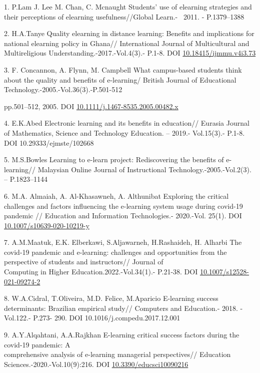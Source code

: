 \begin{references}
1. P.Lam J. Lee M. Chan, C. Mcnaught Students' use of elearning
strategies and their perceptions of elearning usefulness//Global
Learn.-\emph{~} 2011. - P.1379--1388

2. H.A.Tanye Quality elearning in distance learning: Benefits and
implications for national elearning policy in Ghana// International
Journal of Multicultural and Multireligious
Understanding.-2017.-Vol.4(3).- P.1-8. DOI
\href{http://dx.doi.org/10.18415/ijmmu.v4i3.73}{10.18415/ijmmu.v4i3.73}

3. F. Concannon, A. Flynn, M. Campbell What campus-based students think
about the quality and benefits of e-learning/ British Journal of
Educational Technology.-2005.-Vol.36(3).-P.501-512

pp.501--512, 2005. DOI
\href{http://dx.doi.org/10.1111/j.1467-8535.2005.00482.x}{10.1111/j.1467-8535.2005.00482.x}

4. E.K.Abed Electronic learning and its benefits in education// Eurasia
Journal of Mathematics, Science and Technology Education. -- 2019.-
Vol.15(3).- P.1-8. DOI 10.29333/ejmste/102668

5. M.S.Bowles Learning to e-learn project: Rediscovering the benefits of
e-learning// Malaysian Online Journal of Instructional
Technology.-2005.-Vol.2(3). -- P.1823--1144

6. M.A. Almaiah, A. Al-Khasawneh, A. Althunibat Exploring the critical
challenges and factors influencing the e-learning system usage during
covid-19 pandemic // Education and Information Technologies.- 2020.-Vol.
25(1). DOI
\href{https://link.springer.com/article/10.1007/s10639-020-10219-y}{10.1007/s10639-020-10219-y}

7. A.M.Maatuk, E.K. Elberkawi, S.Aljawarneh, H.Rashaideh, H. Alharbi The
covid-19 pandemic and e-learning: challenges and opportunities from the
perspective of students and instructors// Journal of \\Computing in Higher
Education.2022.-Vol.34(1).- P.21-38. DOI
\href{https://doi.org/10.1007/s12528-021-09274-2}{10.1007/s12528-021-09274-2}

8. W.A.Cidral, T.Oliveira, M.D. Felice, M.Aparicio E-learning success
determinants: Brazilian empirical study// Computers and Education.-
2018. -Vol.122.- P.273- 290. DOI 10.1016/j.compedu.2017.12.001

9. A.Y.Alqahtani, A.A.Rajkhan E-learning critical success factors during
the covid-19 pandemic: A \\comprehensive analysis of e-learning managerial
perspectives// Education Sciences.-2020.-Vol.10(9):216. DOI
\href{http://dx.doi.org/10.3390/educsci10090216}{10.3390/educsci10090216}


\end{references}
